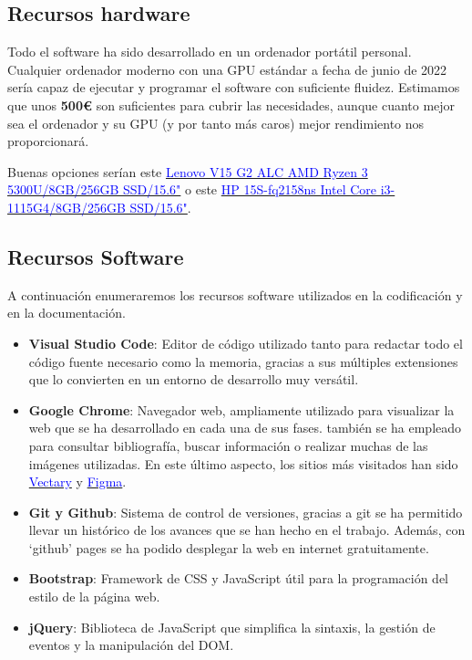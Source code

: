 \subsection{Recursos hardware}

Todo el software ha sido desarrollado en un ordenador portátil personal. Cualquier ordenador moderno con una GPU estándar a fecha de junio de 2022 sería capaz de ejecutar y programar el software con suficiente fluidez. Estimamos que unos \textbf{500\euro} son suficientes para cubrir las necesidades, aunque cuanto mejor sea el ordenador y su GPU (y por tanto más caros) mejor rendimiento nos proporcionará.

Buenas opciones serían este \href{https://www.pccomponentes.com/lenovo-v15-g2-alc-amd-ryzen-3-5300u-8gb-256gb-ssd-156}{\textcolor{blue}{Lenovo V15 G2 ALC AMD Ryzen 3 5300U/8GB/256GB SSD/15.6"}} o este \href{https://www.pccomponentes.com/hp-15s-fq2158ns-intel-core-i3-1115g4-8gb-256gb-ssd-156}{\textcolor{blue}{HP 15S-fq2158ns Intel Core i3-1115G4/8GB/256GB SSD/15.6"}}.

\subsection{Recursos Software}

A continuación enumeraremos los recursos software utilizados en la codificación y en la documentación.

\begin{itemize}
    \item \textbf{Visual Studio Code}: Editor de código utilizado tanto para redactar todo el código fuente necesario como la memoria, gracias a sus múltiples extensiones que lo convierten en un entorno de desarrollo muy versátil.
    \item \textbf{Google Chrome}: Navegador web, ampliamente utilizado para visualizar la web que se ha desarrollado en cada una de sus fases. también se ha empleado para consultar bibliografía, buscar información o realizar muchas de las imágenes utilizadas. En este último aspecto, los sitios más visitados han sido \href{https://www.vectary.com/}{\textcolor{blue}{Vectary}} y  \href{https://www.figma.com/}{\textcolor{blue}{Figma}}.
    \item \textbf{Git y Github}: Sistema de control de versiones, gracias a git se ha permitido llevar un histórico de los avances que se han hecho en el trabajo. Además, con `github' pages se ha podido desplegar la web en internet gratuitamente.
    \item \textbf{Bootstrap}: Framework de CSS y JavaScript útil para la programación del estilo de la página web.
    \item \textbf{jQuery}: Biblioteca de JavaScript que simplifica la sintaxis, la gestión de eventos y la manipulación del DOM.
\end{itemize}

